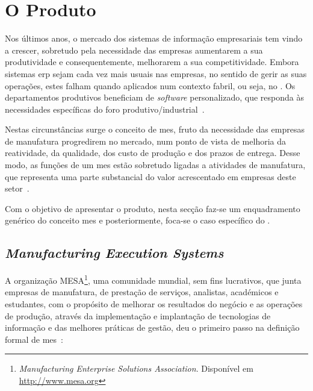 \section{O Produto}
\label{sec:chap02_product}

Nos últimos anos, o mercado dos sistemas de informação empresariais tem vindo a crescer, sobretudo pela necessidade das empresas aumentarem a sua produtividade e consequentemente, melhorarem a sua competitividade. Embora sistemas \gls{erp} sejam cada vez mais usuais nas empresas, no sentido de gerir as suas operações, estes falham quando aplicados num contexto fabril, ou seja, no . Os departamentos produtivos beneficiam de \textit{software} personalizado, que responda às necessidades específicas do foro produtivo/industrial~\parencite{mes_literature_review}. 

Nestas circunstâncias surge o conceito de \gls{mes}, fruto da necessidade das empresas de manufatura progredirem no mercado, num ponto de vista de melhoria da reatividade, da qualidade, dos custo de produção e dos prazos de entrega. Desse modo, as funções de um \gls{mes} estão sobretudo ligadas a atividades de manufatura, que representa uma parte substancial do valor acrescentado em empresas deste setor~\parencite{mes_literature_review}. 

Com o objetivo de apresentar o produto, nesta secção faz-se um enquadramento genérico do conceito \gls{mes} e posteriormente, foca-se o caso específico do {\productname}.

\subsection{\textit{Manufacturing Execution Systems}}

A organização MESA\footnote{\textit{Manufacturing Enterprise Solutions Association}. Disponível em \url{http://www.mesa.org}}, uma comunidade mundial, sem fins lucrativos, que junta empresas de manufatura, de prestação de serviços, analistas, académicos e estudantes, com o propósito de melhorar os resultados do negócio e as operações de produção, através da implementação e implantação de tecnologias de informação e das melhores práticas de gestão, deu o primeiro passo na definição formal de \gls{mes}~\parencite{mes_explained_high_level_vision}:

